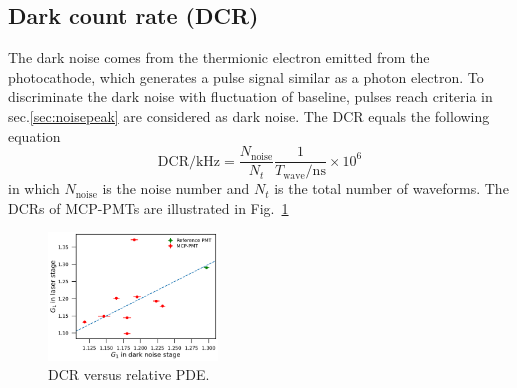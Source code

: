 \subsection{Dark count rate (DCR)}
The dark noise comes from the thermionic electron emitted from the photocathode, which generates a pulse signal similar as a photon electron. To discriminate the dark noise with fluctuation of baseline, pulses reach criteria in sec.\ref{sec:noisepeak} are considered as dark noise. The DCR equals the following equation
\begin{equation}
    \mathrm{DCR/kHz} = \frac{N_{\mathrm{noise}}}{N_{t}}\frac{1}{T_{\mathrm{wave}}/\mathrm{ns}}\times 10^{6}
\end{equation}
in which $N_{\mathrm{noise}}$ is the noise number and $N_{t}$ is the total number of waveforms. The DCRs of MCP-PMTs are illustrated in Fig.~\ref{fig:DCRCompare}

\begin{figure}[!htbp]
    \centering
    \includegraphics[width=0.4\textwidth,page=8]{figures/result/compare.pdf}
    \caption{DCR versus relative PDE.}
    \label{fig:DCRCompare}
\end{figure}

